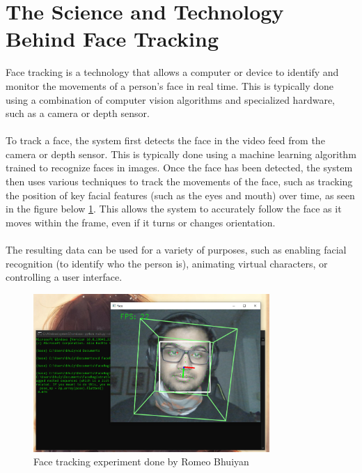 \section{The Science and Technology Behind Face Tracking}
Face tracking is a technology that allows a computer or device to identify
and monitor the movements of a person's face in real time. 
This is typically done using a combination of computer vision 
algorithms and specialized hardware, such as a camera or depth sensor.
\\
\\
To track a face, the system first detects the face in 
the video feed from the camera or depth sensor. This is 
typically done using a machine learning algorithm trained to 
recognize faces in images. Once the face has been detected, 
the system then uses various techniques to track the movements 
of the face, such as tracking the position of key facial features
(such as the eyes and mouth) over time, as seen in the figure below \ref{fig:facetracking}.
 This allows the system to accurately follow the face as it moves within the frame, even if it 
turns or changes orientation.
\\
\\
The resulting data can be used for a variety of 
purposes, such as enabling facial recognition 
(to identify who the person is), animating virtual characters, 
or controlling a user interface.
\\
\begin{figure}[htb]
    \centering
    \includegraphics[width=0.8\textwidth]{pics/bhuiyanfracetracking.png}
    \caption{Face tracking experiment done by Romeo Bhuiyan}
    \label{fig:facetracking}
\end{figure}


